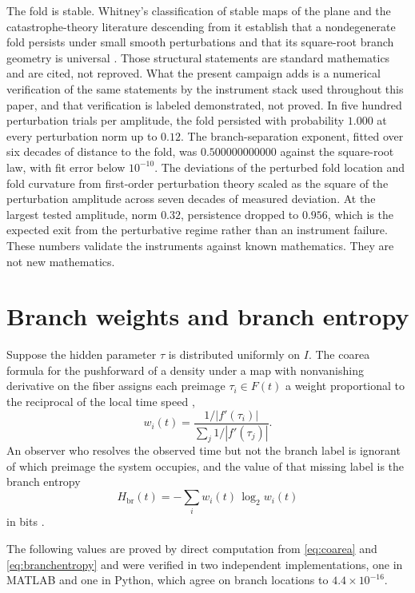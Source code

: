 \documentclass[aps,pre,reprint,nofootinbib]{revtex4-2}
\begin{document}
The fold is stable.  Whitney's classification of stable maps of the plane
and the catastrophe-theory literature descending from it establish that a
nondegenerate fold persists under small smooth perturbations and that its
square-root branch geometry is universal \cite{Whitney1955,Arnold1992}.
Those structural statements are standard mathematics and are cited, not
reproved.  What the present campaign adds is a numerical verification of
the same statements by the instrument stack used throughout this paper, and
that verification is labeled demonstrated, not proved.  In five hundred
perturbation trials per amplitude, the fold persisted with probability
$1.000$ at every perturbation norm up to $0.12$.  The branch-separation
exponent, fitted over six decades of distance to the fold, was
$0.500000000000$ against the square-root law, with fit error below
$10^{-10}$.  The deviations of the perturbed fold location and fold
curvature from first-order perturbation theory scaled as the square of the
perturbation amplitude across seven decades of measured deviation.  At the
largest tested amplitude, norm $0.32$, persistence dropped to $0.956$,
which is the expected exit from the perturbative regime rather than an
instrument failure.  These numbers validate the instruments against known
mathematics.  They are not new mathematics.

\section{Branch weights and branch entropy}
\label{sec:weights}

Suppose the hidden parameter $\tau$ is distributed uniformly on $I$.  The
coarea formula for the pushforward of a density under a map with
nonvanishing derivative on the fiber assigns each preimage
$\tau_i \in F(t)$ a weight proportional to the reciprocal of the local time
speed \cite{EvansGariepy1992},
\begin{equation}
  w_i(t) = \frac{1/|f'(\tau_i)|}{\sum_{j} 1/|f'(\tau_j)|}.
  \label{eq:coarea}
\end{equation}
An observer who resolves the observed time but not the branch label is
ignorant of which preimage the system occupies, and the value of that
missing label is the branch entropy
\begin{equation}
  H_{\mathrm{br}}(t) = -\sum_i w_i(t)\, \log_2 w_i(t)
  \label{eq:branchentropy}
\end{equation}
in bits \cite{CoverThomas2006,Jaynes1957}.

The following values are proved by direct computation from
\eqref{eq:coarea} and \eqref{eq:branchentropy} and were verified in two
independent implementations, one in MATLAB and one in Python, which agree
on branch locations to $4.4 \times 10^{-16}$.
\end{document}
